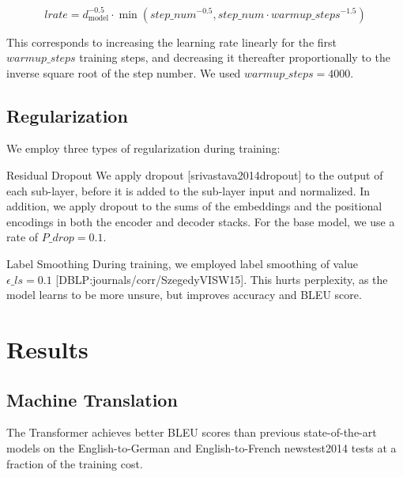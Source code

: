 \documentclass[11pt,a4paper]{article}
\begin{document}
$$lrate = d_{\text{model}}^{-0.5} \cdot
  \min({step\_num}^{-0.5},
    {step\_num} \cdot {warmup\_steps}^{-1.5})$$

This corresponds to increasing the learning rate linearly for the first $warmup\_steps$ training steps, and decreasing it thereafter proportionally to the inverse square root of the step number.  We used $warmup\_steps=4000$.

\subsection{Regularization}

We employ three types of regularization during training:

Residual Dropout We apply dropout [srivastava2014dropout] to the output of each sub-layer, before it is added to the sub-layer input and normalized.   In addition, we apply dropout to the sums of the embeddings and the positional encodings in both the encoder and decoder stacks.  For the base model, we use a rate of $P\_{drop}=0.1$.

Label Smoothing During training, we employed label smoothing of value $\epsilon\_{ls}=0.1$ [DBLP:journals/corr/SzegedyVISW15].  This hurts perplexity, as the model learns to be more unsure, but improves accuracy and BLEU score.

\section{Results}

\subsection{Machine Translation}

The Transformer achieves better BLEU scores than previous state-of-the-art models on the English-to-German and English-to-French newstest2014 tests at a fraction of the training cost.
\end{document}
